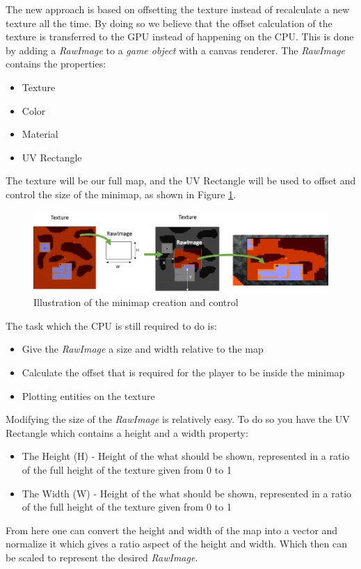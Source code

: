 The new approach is based on offsetting the texture instead of recalculate a new texture all the time.
By doing so we believe that the offset calculation of the texture is transferred to the GPU instead of happening on the CPU.
This is done by adding a \textit{RawImage} to a \textit{game object} with a canvas renderer.
The \textit{RawImage} contains the properties:
\begin{itemize}
\item Texture
\item Color
\item Material
\item UV Rectangle
\end{itemize}
The texture will be our full map, and the UV Rectangle will be used to offset and control the size of the minimap, as shown in Figure \ref{minimap:creation}.
\begin{figure}[H]
    \includegraphics[width = \textwidth]{figures/minimap/RawImage.png}
    \caption{Illustration of the minimap creation and control}
    \label{minimap:creation}
\end{figure}

The task which the CPU is still required to do is:
\begin{itemize}
\item Give the \textit{RawImage} a size and width relative to the map
\item Calculate the offset that is required for the player to be inside the minimap
\item Plotting entities on the texture
\end{itemize}
Modifying the size of the \textit{RawImage} is relatively easy. 
To do so you have the UV Rectangle which contains a height and a width property:
\begin{itemize}
\item The Height (H) - Height of the what should be shown, represented in a ratio of the full height of the texture given from 0 to 1
\item The Width (W) - Height of the what should be shown, represented in a ratio of the full height of the texture given from 0 to 1
\end{itemize}
From here one can convert the height and width of the map into a vector and normalize it which gives a  ratio aspect of the height and width. Which then can be scaled to represent the desired \textit{RawImage}.

